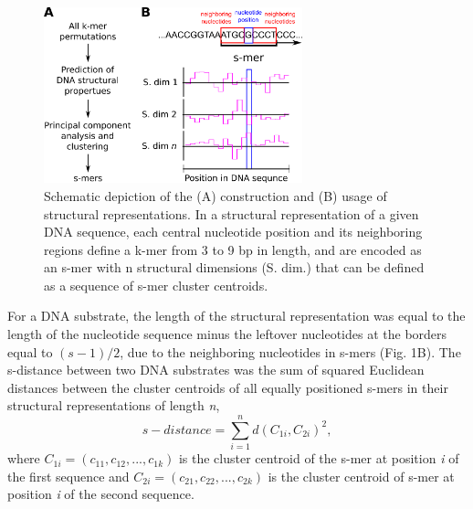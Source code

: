 \documentclass[10pt]{article}
\begin{document}
\begin{figure}[ht]
  \centering
  \includegraphics[width=7.5cm,keepaspectratio]{smir_fig_smers.png}
  \caption{Schematic depiction of the (A) construction and (B) usage of structural representations. In a structural representation of a given DNA sequence, each central nucleotide position and its neighboring regions define a k-mer from 3 to 9 bp in length, and are encoded as an s-mer with n structural dimensions (S. dim.) that can be defined as a sequence of s-mer cluster centroids.}
\end{figure}

For a DNA substrate, the length of the structural representation was equal to the length of the nucleotide sequence minus the leftover nucleotides at the borders equal to $(s-1)/2$, due to the neighboring nucleotides in s-mers (Fig. 1B). The s-distance between two DNA substrates was the sum of squared Euclidean distances between the cluster centroids of all equally positioned s-mers in their structural representations of length \textit{n},
\begin{equation}
  s-distance=\sum_{i=1}^{n}d(C_{1i}, C_{2i})^2,
\end{equation}
where \(C_{1i} = (c_{11}, c_{12},..., c_{1k})\) is the cluster centroid of the s-mer at position \textit{i} of the first sequence and \(C_{2i} = (c_{21}, c_{22},..., c_{2k})\) is the cluster centroid of s-mer at position \textit{i} of the second sequence.
\end{document}
